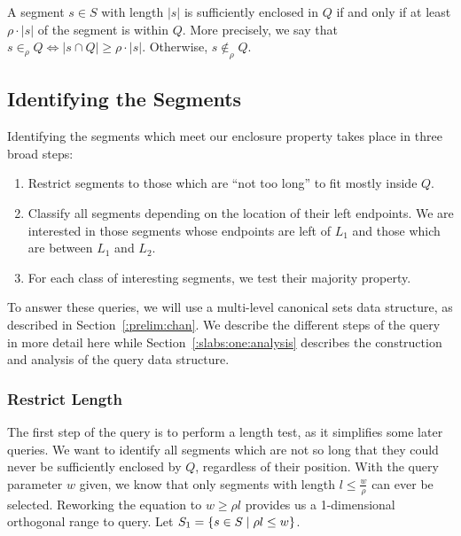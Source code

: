A segment $s \in S$ with length $|s|$ is sufficiently enclosed in $Q$ if and only if at least $\rho \cdot |s|$ of the segment is within $Q$. More precisely, we say that $s \in_\rho Q \Leftrightarrow |s \cap Q| \geq \rho \cdot |s|$. Otherwise, $s \not \in_\rho Q$.


\subsection{Identifying the Segments}
\label{:slabs:one:approach}

Identifying the segments which meet our enclosure property takes place in three broad steps:

\begin{enumerate}
 \item Restrict segments to those which are ``not too long'' to fit mostly inside $Q$.

 \item Classify all segments depending on the location of their left endpoints. We are interested in those segments whose endpoints are left of $L_1$ and those which are between $L_1$ and $L_2$.

 \item For each class of interesting segments, we test their majority property.

\end{enumerate}

To answer these queries, we will use a multi-level canonical sets data structure, as described in Section~\ref{:prelim:chan}. We describe the different steps of the query in more detail here while Section~\ref{:slabs:one:analysis} describes the construction and analysis of the query data structure.


\subsubsection{Restrict Length}
\label{:slabs:one:details:restrict}

The first step of the query is to perform a length test, as it simplifies some later queries.  We want to identify all segments which are not so long that they could never be sufficiently enclosed by $Q$, regardless of their position. With the query parameter $w$ given, we know that only segments with length $l \leq \frac{w}{\rho}$ can ever be selected. Reworking the equation to $w \geq \rho l$ provides us a 1-dimensional orthogonal range to query. Let $S_1 = \{ s \in S \;|\; \rho l \leq w \}$.


